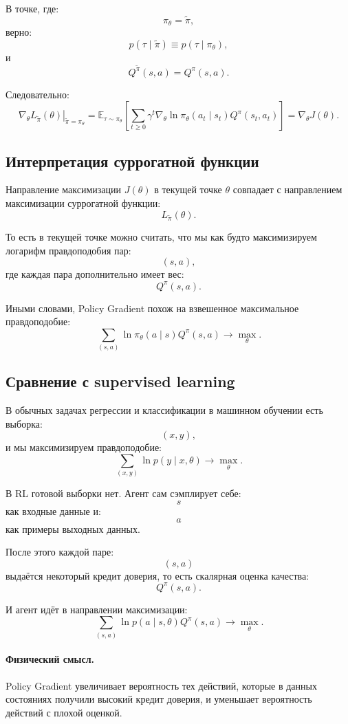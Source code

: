 \documentclass[12pt,a4paper]{article}
\begin{document}
В точке, где:
\[
\pi_\theta=\tilde\pi,
\]
верно:
\[
p(\tau\mid\tilde\pi)
\equiv
p(\tau\mid\pi_\theta),
\]
и
\[
Q^{\tilde\pi}(s,a)
=
Q^\pi(s,a).
\]

Следовательно:
\[
\left.
\nabla_\theta L_{\tilde\pi}(\theta)
\right|_{\tilde\pi=\pi_\theta}
=
\mathbb E_{\tau\sim\pi_\theta}
\left[
\sum_{t\ge 0}
\gamma^t
\nabla_\theta
\ln \pi_\theta(a_t\mid s_t)
Q^\pi(s_t,a_t)
\right]
=
\nabla_\theta J(\theta).
\]

\subsection{Интерпретация суррогатной функции}

Направление максимизации $J(\theta)$ в текущей точке $\theta$ совпадает с направлением максимизации суррогатной функции:
\[
L_{\tilde\pi}(\theta).
\]

То есть в текущей точке можно считать, что мы как будто максимизируем логарифм правдоподобия пар:
\[
(s,a),
\]
где каждая пара дополнительно имеет вес:
\[
Q^\pi(s,a).
\]

Иными словами, Policy Gradient похож на взвешенное максимальное правдоподобие:
\[
\sum_{(s,a)}
\ln \pi_\theta(a\mid s)
Q^\pi(s,a)
\to
\max_\theta.
\]

\subsection{Сравнение с supervised learning}

В обычных задачах регрессии и классификации в машинном обучении есть выборка:
\[
(x,y),
\]
и мы максимизируем правдоподобие:
\[
\sum_{(x,y)}
\ln p(y\mid x,\theta)
\to
\max_\theta.
\]

В RL готовой выборки нет. Агент сам сэмплирует себе:
\[
s
\]
как входные данные и:
\[
a
\]
как примеры выходных данных.

После этого каждой паре:
\[
(s,a)
\]
выдаётся некоторый кредит доверия, то есть скалярная оценка качества:
\[
Q^\pi(s,a).
\]

И агент идёт в направлении максимизации:
\[
\sum_{(s,a)}
\ln p(a\mid s,\theta)
Q^\pi(s,a)
\to
\max_\theta.
\]

\paragraph{Физический смысл.}

Policy Gradient увеличивает вероятность тех действий, которые в данных состояниях получили высокий кредит доверия, и уменьшает вероятность действий с плохой оценкой.
\end{document}

